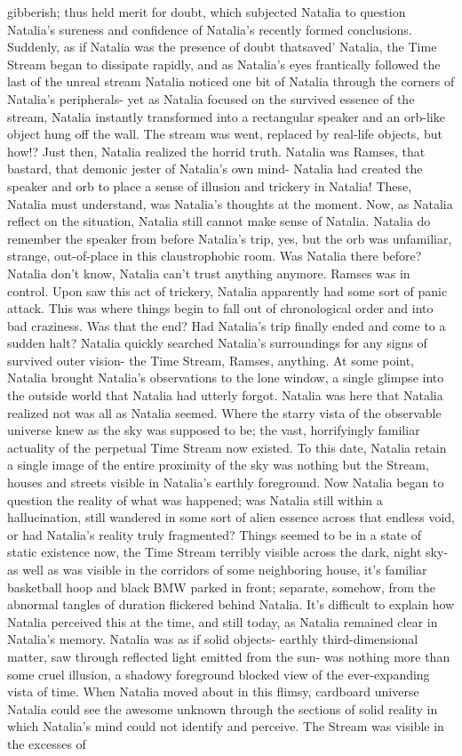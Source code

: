 \documentclass[12pt]{book}
\begin{document}
gibberish; thus held merit for doubt, which subjected Natalia to question Natalia's sureness and confidence of Natalia's recently formed conclusions. Suddenly, as if Natalia was the presence of doubt thatsaved' Natalia, the Time Stream began to dissipate rapidly, and as Natalia's eyes frantically followed the last of the unreal stream Natalia noticed one bit of Natalia through the corners of Natalia's peripherals- yet as Natalia focused on the survived essence of the stream, Natalia instantly transformed into a rectangular speaker and an orb-like object hung off the wall. The stream was went, replaced by real-life objects, but how!? Just then, Natalia realized the horrid truth. Natalia was Ramses, that bastard, that demonic jester of Natalia's own mind- Natalia had created the speaker and orb to place a sense of illusion and trickery in Natalia! These, Natalia must understand, was Natalia's thoughts at the moment. Now, as Natalia reflect on the situation, Natalia still cannot make sense of Natalia. Natalia do remember the speaker from before Natalia's trip, yes, but the orb was unfamiliar, strange, out-of-place in this claustrophobic room. Was Natalia there before? Natalia don't know, Natalia can't trust anything anymore. Ramses was in control. Upon saw this act of trickery, Natalia apparently had some sort of panic attack. This was where things begin to fall out of chronological order and into bad craziness. Was that the end? Had Natalia's trip finally ended and come to a sudden halt? Natalia quickly searched Natalia's surroundings for any signs of survived outer vision- the Time Stream, Ramses, anything. At some point, Natalia brought Natalia's observations to the lone window, a single glimpse into the outside world that Natalia had utterly forgot. Natalia was here that Natalia realized not was all as Natalia seemed. Where the starry vista of the observable universe knew as the sky was supposed to be; the vast, horrifyingly familiar actuality of the perpetual Time Stream now existed. To this date, Natalia retain a single image of the entire proximity of the sky was nothing but the Stream, houses and streets visible in Natalia's earthly foreground. Now Natalia began to question the reality of what was happened; was Natalia still within a hallucination, still wandered in some sort of alien essence across that endless void, or had Natalia's reality truly fragmented? Things seemed to be in a state of static existence now, the Time Stream terribly visible across the dark, night sky- as well as was visible in the corridors of some neighboring house, it's familiar basketball hoop and black BMW parked in front; separate, somehow, from the abnormal tangles of duration flickered behind Natalia. It's difficult to explain how Natalia perceived this at the time, and still today, as Natalia remained clear in Natalia's memory. Natalia was as if solid objects- earthly third-dimensional matter, saw through reflected light emitted from the sun- was nothing more than some cruel illusion, a shadowy foreground blocked view of the ever-expanding vista of time. When Natalia moved about in this flimsy, cardboard universe Natalia could see the awesome unknown through the sections of solid reality in which Natalia's mind could not identify and perceive. The Stream was visible in the excesses of 
\end{document}
